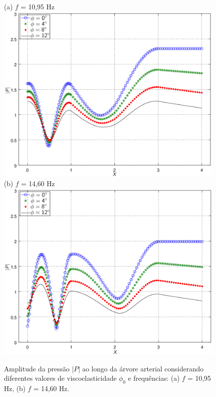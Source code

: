 \documentclass[
        english,			
        brazil			        %
        ,<...>]{abntbibufjf}
\begin{document}
\begin{figure}[!htbp]
	\centering
	(a) $f$ = 10,95 Hz\\
	\includegraphics[scale=0.7]{figure4-result-new/fig4_P_f10_95_visco_new2.png}\\
	(b) $f$ = 14,60 Hz\\
	\includegraphics[scale=0.7]{figure4-result-new/fig4_P_f14_60_visco_new2.png}\\
	\caption{Amplitude da pressão $|P|$ ao longo da árvore arterial considerando diferentes valores de viscoelasticidade $\phi_0$ e frequências: (a) $f$ = 10,95 Hz, (b) $f$ = 14,60 Hz.}
	\label{fig4b:arterial-tree}%
\end{figure}
\end{document}
